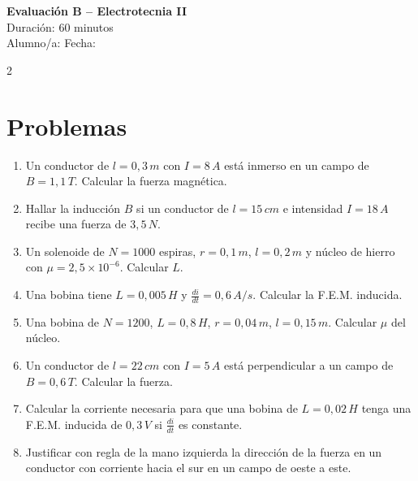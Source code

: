 \documentclass[a4paper,12pt]{article}
\begin{document}
\begin{center}
    \Large \textbf{Evaluación B – Electrotecnia II} \\
    \normalsize Duración: 60 minutos \\
    Alumno/a: \underline{\hspace{6cm}} \hspace{0.5cm} Fecha: \underline{\hspace{2cm}}
\end{center}

\vspace{0.3cm}

\begin{multicols}{2}

\section*{Problemas}

\begin{enumerate}
\item Un conductor de $l = 0{,}3\,m$ con $I = 8\,A$ está inmerso en un campo de $B = 1{,}1\,T$. Calcular la fuerza magnética.

\item Hallar la inducción $B$ si un conductor de $l = 15\,cm$ e intensidad $I = 18\,A$ recibe una fuerza de $3{,}5\,N$.

\item Un solenoide de $N = 1000$ espiras, $r = 0{,}1\,m$, $l = 0{,}2\,m$ y núcleo de hierro con $\mu = 2{,}5 \times 10^{-6}$. Calcular $L$.

\item Una bobina tiene $L = 0{,}005\,H$ y $\frac{di}{dt} = 0{,}6\,A/s$. Calcular la F.E.M. inducida.

\item Una bobina de $N = 1200$, $L = 0{,}8\,H$, $r = 0{,}04\,m$, $l = 0{,}15\,m$. Calcular $\mu$ del núcleo.

\item Un conductor de $l = 22\,cm$ con $I = 5\,A$ está perpendicular a un campo de $B = 0{,}6\,T$. Calcular la fuerza.

\item Calcular la corriente necesaria para que una bobina de $L = 0{,}02\,H$ tenga una F.E.M. inducida de $0{,}3\,V$ si $\frac{di}{dt}$ es constante.

\item Justificar con regla de la mano izquierda la dirección de la fuerza en un conductor con corriente hacia el sur en un campo de oeste a este.

\end{enumerate}

\end{multicols}
\end{document}

